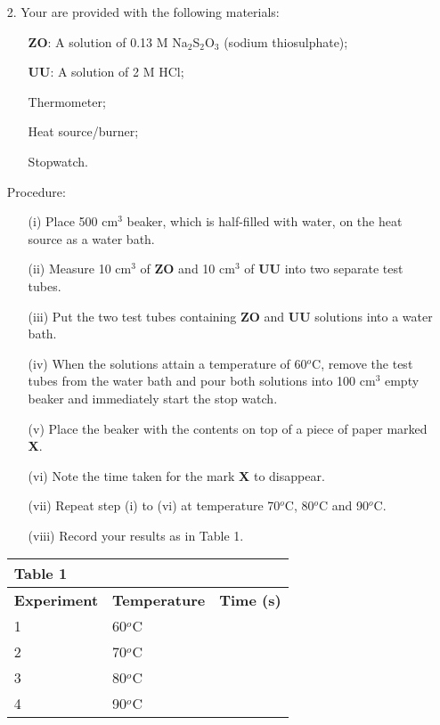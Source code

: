 \begin{enumerate}
\raggedright

\item[2.] Your are provided with the following materials:\\
\begin{enumerate}
\item[ ] \textbf{ZO}:  A solution of 0.13 M Na$_2$S$_2$O$_3$ (sodium thiosulphate);
\item[ ] \textbf{UU}:  A solution of 2 M HCl;
\item[ ] Thermometer;
\item[ ] Heat source/burner;
\item[ ] Stopwatch.\\
\end{enumerate}

Procedure:\\
\begin{enumerate}
\item[(i)] Place 500 cm$^3$ beaker, which is half-filled with water, on the heat source as a water bath.
\item[(ii)] Measure 10 cm$^3$ of \textbf{ZO} and 10 cm$^3$ of \textbf{UU} into two separate test tubes.
\item[(iii)] Put the two test tubes containing \textbf{ZO} and \textbf{UU} solutions into a water bath.
\item[(iv)] When the solutions attain a temperature of 60$^o$C, remove the test tubes from the water bath and pour both solutions into 100 cm$^3$ empty beaker and immediately start the stop watch.
\item[(v)] Place the beaker with the contents on top of a piece of paper marked \textbf{X}.
\item[(vi)] Note the time taken for the mark \textbf{X} to disappear.
\item[(vii)] Repeat step (i) to (vi) at temperature 70$^o$C, 80$^o$C and 90$^o$C.
\item[(viii)] Record your results as in Table 1.
\end{enumerate}

\newpage

\begin{center}
\begin{tabular}{|p{5cm}|p{5cm}|p{3cm}|}
\multicolumn{1}{l}{Table 1}&\multicolumn{1}{l}{ }&\multicolumn{1}{l}{ }\\ \hline
\textbf{Experiment}&\textbf{Temperature}&\textbf{Time (s)}\\ \hline
1&60$^o$C&\\ \hline
2&70$^o$C&\\ \hline
3&80$^o$C&\\ \hline
4&90$^o$C&\\ \hline
\end{tabular}
\end{center}


\end{enumerate}
